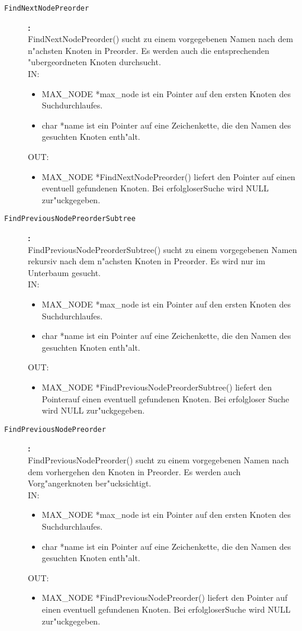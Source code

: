 \begin{description}
\item[\tt FindNextNodePreorder]{\bf :\\}
FindNextNodePreorder() sucht zu einem vorgegebenen Namen nach dem n"achsten Knoten in Preorder. Es werden auch die entsprechenden "ubergeordneten Knoten durchsucht. \\
IN:
\begin{itemize}
   \item MAX\_NODE *max\_node ist ein Pointer auf den ersten Knoten des Suchdurchlaufes.
   \item char *name ist ein Pointer auf eine Zeichenkette, die den Namen des gesuchten Knoten enth"alt.
\end{itemize}
OUT:
\begin{itemize}
   \item MAX\_NODE *FindNextNodePreorder() liefert den Pointer auf einen eventuell gefundenen Knoten. Bei erfolgloserSuche wird NULL zur"uckgegeben.
\end{itemize}

\item[\tt FindPreviousNodePreorderSubtree]{\bf :\\}
FindPreviousNodePreorderSubtree() sucht zu einem vorgegebenen Namen rekursiv nach dem n"achsten Knoten in Preorder. Es wird nur im Unterbaum gesucht. \\
IN:
\begin{itemize}
   \item MAX\_NODE *max\_node ist ein Pointer auf den ersten Knoten des Suchdurchlaufes.
   \item char *name ist ein Pointer auf eine Zeichenkette, die den Namen des gesuchten Knoten enth"alt.
\end{itemize}
OUT:
\begin{itemize}
   \item MAX\_NODE *FindPreviousNodePreorderSubtree() liefert den Pointerauf einen eventuell gefundenen Knoten. Bei erfolgloser Suche wird NULL zur"uckgegeben.
\end{itemize}

\item[\tt FindPreviousNodePreorder]{\bf :\\}
FindPreviousNodePreorder() sucht zu einem vorgegebenen Namen nach dem vorhergehen den Knoten in Preorder. Es werden auch Vorg"angerknoten ber"ucksichtigt. \\
IN:
\begin{itemize}
   \item MAX\_NODE *max\_node ist ein Pointer auf den ersten Knoten des Suchdurchlaufes.
   \item char *name ist ein Pointer auf eine Zeichenkette, die den Namen des gesuchten Knoten enth"alt.
\end{itemize}
OUT:
\begin{itemize}
   \item MAX\_NODE *FindPreviousNodePreorder() liefert den Pointer auf einen eventuell gefundenen Knoten. Bei erfolgloserSuche wird NULL zur"uckgegeben.
\end{itemize}


\end{description}
